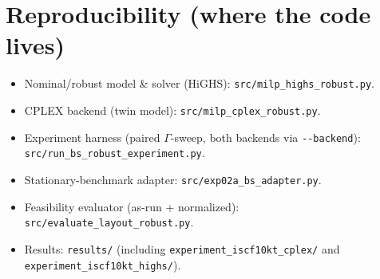 \documentclass[11pt]{article}
\theoremstyle{definition}
\theoremstyle{plain}
\theoremstyle{remark}
\begin{document}
\section*{Reproducibility (where the code lives)}

\begin{itemize}[nosep]
  \item Nominal/robust model \& solver (HiGHS): \texttt{src/milp\_highs\_robust.py}.
  \item CPLEX backend (twin model): \texttt{src/milp\_cplex\_robust.py}.
  \item Experiment harness (paired $\Gamma$-sweep, both backends via
  \texttt{-{}-backend}): \texttt{src/run\_bs\_robust\_experiment.py}.
  \item Stationary-benchmark adapter: \texttt{src/exp02a\_bs\_adapter.py}.
  \item Feasibility evaluator (as-run + normalized): \texttt{src/evaluate\_layout\_robust.py}.
  \item Results: \texttt{results/} (including
  \texttt{experiment\_iscf10kt\_cplex/} and \texttt{experiment\_iscf10kt\_highs/}).
\end{itemize}
\end{document}
